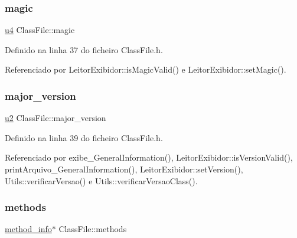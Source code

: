 \mbox{\label{classClassFile_a09085e9db513dae2f46da6e0a26c1b59}} 
\subsubsection{\texorpdfstring{magic}{magic}}
{\footnotesize\ttfamily \hyperlink{BasicTypes_8h_ae5be1f726785414dd1b77d60df074c9d}{u4} Class\+File\+::magic}



Definido na linha 37 do ficheiro Class\+File.\+h.



Referenciado por Leitor\+Exibidor\+::is\+Magic\+Valid() e Leitor\+Exibidor\+::set\+Magic().

\mbox{\label{classClassFile_abede9cb937e65072517d0ee6e26e2757}} 
\subsubsection{\texorpdfstring{major\+\_\+version}{major\_version}}
{\footnotesize\ttfamily \hyperlink{BasicTypes_8h_a732cde1300aafb73b0ea6c2558a7a54f}{u2} Class\+File\+::major\+\_\+version}



Definido na linha 39 do ficheiro Class\+File.\+h.



Referenciado por exibe\+\_\+\+General\+Information(), Leitor\+Exibidor\+::is\+Version\+Valid(), print\+Arquivo\+\_\+\+General\+Information(), Leitor\+Exibidor\+::set\+Version(), Utils\+::verificar\+Versao() e Utils\+::verificar\+Versao\+Class().

\mbox{\label{classClassFile_ad061f06cd709d10dbfbf82f443e43632}} 
\subsubsection{\texorpdfstring{methods}{methods}}
{\footnotesize\ttfamily \hyperlink{structmethod__info}{method\+\_\+info}$\ast$ Class\+File\+::methods}



